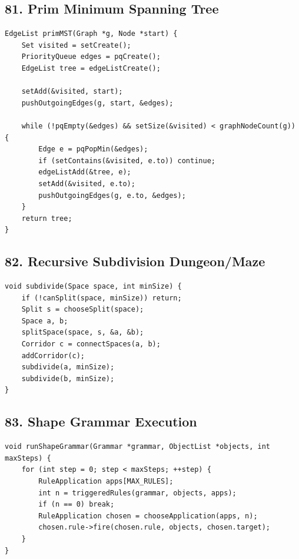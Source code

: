 \documentclass[10pt,letterpaper]{article}
\begin{document}
\subsection*{81. Prim Minimum Spanning Tree}
{}

\begin{verbatim}
EdgeList primMST(Graph *g, Node *start) {
    Set visited = setCreate();
    PriorityQueue edges = pqCreate();
    EdgeList tree = edgeListCreate();

    setAdd(&visited, start);
    pushOutgoingEdges(g, start, &edges);

    while (!pqEmpty(&edges) && setSize(&visited) < graphNodeCount(g)) {
        Edge e = pqPopMin(&edges);
        if (setContains(&visited, e.to)) continue;
        edgeListAdd(&tree, e);
        setAdd(&visited, e.to);
        pushOutgoingEdges(g, e.to, &edges);
    }
    return tree;
}
\end{verbatim}

\subsection*{82. Recursive Subdivision Dungeon/Maze}
{}

\begin{verbatim}
void subdivide(Space space, int minSize) {
    if (!canSplit(space, minSize)) return;
    Split s = chooseSplit(space);
    Space a, b;
    splitSpace(space, s, &a, &b);
    Corridor c = connectSpaces(a, b);
    addCorridor(c);
    subdivide(a, minSize);
    subdivide(b, minSize);
}
\end{verbatim}

\subsection*{83. Shape Grammar Execution}
{}

\begin{verbatim}
void runShapeGrammar(Grammar *grammar, ObjectList *objects, int maxSteps) {
    for (int step = 0; step < maxSteps; ++step) {
        RuleApplication apps[MAX_RULES];
        int n = triggeredRules(grammar, objects, apps);
        if (n == 0) break;
        RuleApplication chosen = chooseApplication(apps, n);
        chosen.rule->fire(chosen.rule, objects, chosen.target);
    }
}
\end{verbatim}
\end{document}
